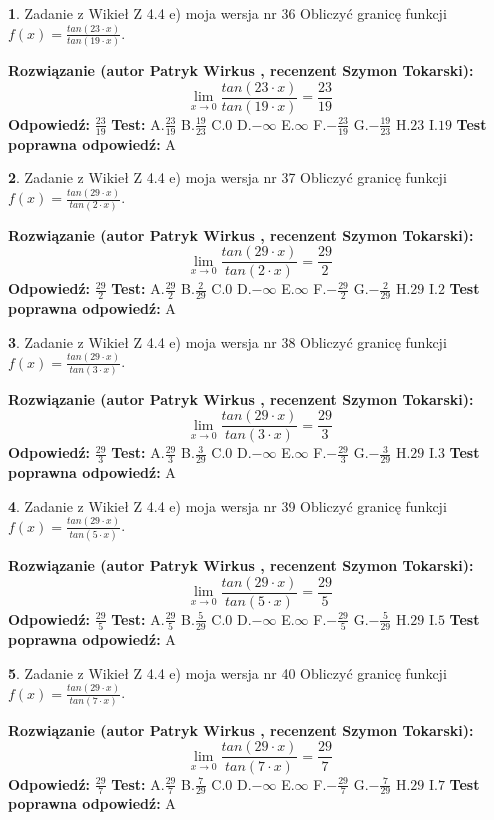\documentclass[12pt, a4paper]{article}
\theoremstyle{definition} %
\newtheorem{zad}{}
\newcommand{\zadStart}[1]{\begin{zad}#1\newline}
\newcommand{\zadStop}{\end{zad}}
\newcommand{\rozwStart}[2]{\noindent \textbf{Rozwiązanie (autor #1 , recenzent #2): }\newline}
\newcommand{\rozwStop}{\newline}
\newcommand{\odpStart}{\noindent \textbf{Odpowiedź:}\newline}
\newcommand{\odpStop}{\newline}
\newcommand{\testStart}{\noindent \textbf{Test:}\newline}
\newcommand{\testStop}{\newline}
\newcommand{\kluczStart}{\noindent \textbf{Test poprawna odpowiedź:}\newline}
\newcommand{\kluczStop}{\newline}
\begin{document}
\zadStart{Zadanie z Wikieł Z 4.4 e) moja wersja nr 36}
Obliczyć granicę funkcji $f(x)=\frac{tan(23\cdot x)}{tan(19\cdot x)}$.
\zadStop
\rozwStart{Patryk Wirkus}{Szymon Tokarski}
$$\lim\limits_{x\to 0}\frac{tan(23\cdot x)}{tan(19\cdot x)}=
\frac{23}{19}$$
\rozwStop
\odpStart
$\frac{23}{19}$
\odpStop
\testStart
A.$\frac{23}{19}$
B.$\frac{19}{23}$
C.$0$
D.$-\infty$
E.$\infty$
F.$-\frac{23}{19}$
G.$-\frac{19}{23}$
H.$23$
I.$19$
\testStop
\kluczStart
A
\kluczStop



\zadStart{Zadanie z Wikieł Z 4.4 e) moja wersja nr 37}
Obliczyć granicę funkcji $f(x)=\frac{tan(29\cdot x)}{tan(2\cdot x)}$.
\zadStop
\rozwStart{Patryk Wirkus}{Szymon Tokarski}
$$\lim\limits_{x\to 0}\frac{tan(29\cdot x)}{tan(2\cdot x)}=
\frac{29}{2}$$
\rozwStop
\odpStart
$\frac{29}{2}$
\odpStop
\testStart
A.$\frac{29}{2}$
B.$\frac{2}{29}$
C.$0$
D.$-\infty$
E.$\infty$
F.$-\frac{29}{2}$
G.$-\frac{2}{29}$
H.$29$
I.$2$
\testStop
\kluczStart
A
\kluczStop



\zadStart{Zadanie z Wikieł Z 4.4 e) moja wersja nr 38}
Obliczyć granicę funkcji $f(x)=\frac{tan(29\cdot x)}{tan(3\cdot x)}$.
\zadStop
\rozwStart{Patryk Wirkus}{Szymon Tokarski}
$$\lim\limits_{x\to 0}\frac{tan(29\cdot x)}{tan(3\cdot x)}=
\frac{29}{3}$$
\rozwStop
\odpStart
$\frac{29}{3}$
\odpStop
\testStart
A.$\frac{29}{3}$
B.$\frac{3}{29}$
C.$0$
D.$-\infty$
E.$\infty$
F.$-\frac{29}{3}$
G.$-\frac{3}{29}$
H.$29$
I.$3$
\testStop
\kluczStart
A
\kluczStop



\zadStart{Zadanie z Wikieł Z 4.4 e) moja wersja nr 39}
Obliczyć granicę funkcji $f(x)=\frac{tan(29\cdot x)}{tan(5\cdot x)}$.
\zadStop
\rozwStart{Patryk Wirkus}{Szymon Tokarski}
$$\lim\limits_{x\to 0}\frac{tan(29\cdot x)}{tan(5\cdot x)}=
\frac{29}{5}$$
\rozwStop
\odpStart
$\frac{29}{5}$
\odpStop
\testStart
A.$\frac{29}{5}$
B.$\frac{5}{29}$
C.$0$
D.$-\infty$
E.$\infty$
F.$-\frac{29}{5}$
G.$-\frac{5}{29}$
H.$29$
I.$5$
\testStop
\kluczStart
A
\kluczStop



\zadStart{Zadanie z Wikieł Z 4.4 e) moja wersja nr 40}
Obliczyć granicę funkcji $f(x)=\frac{tan(29\cdot x)}{tan(7\cdot x)}$.
\zadStop
\rozwStart{Patryk Wirkus}{Szymon Tokarski}
$$\lim\limits_{x\to 0}\frac{tan(29\cdot x)}{tan(7\cdot x)}=
\frac{29}{7}$$
\rozwStop
\odpStart
$\frac{29}{7}$
\odpStop
\testStart
A.$\frac{29}{7}$
B.$\frac{7}{29}$
C.$0$
D.$-\infty$
E.$\infty$
F.$-\frac{29}{7}$
G.$-\frac{7}{29}$
H.$29$
I.$7$
\testStop
\kluczStart
A
\kluczStop
\end{document}
